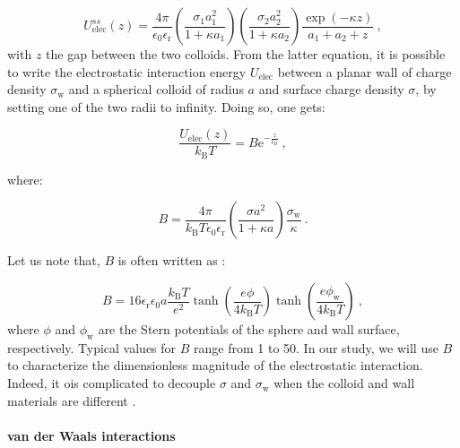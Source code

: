 \begin{equation}
	U_\textrm{elec} ^{ss}(z) = \frac{4\pi}{\epsilon_0 \epsilon_\mathrm{r}} 
	\left(
	\frac{\sigma_1 a_1 ^2}{1 + \kappa a_1}
	\right)
	\left(
	\frac{\sigma_2 a_2 ^2}{1 + \kappa a_2}
	\right)
	\frac{\exp(-\kappa z)}{a_1 + a_2 + z} ~,
\end{equation} 
with $z$ the gap between the two colloids.
From the latter equation, it is possible to write the electrostatic interaction energy $U_\textrm{elec}$ between a planar wall of charge density $\sigma_\textrm{w}$ and a spherical colloid of radius $a$ and surface charge density $\sigma$, by setting one of the two radii to infinity. Doing so, one gets:

\begin{equation}
	\frac{U_\textrm{elec}(z)}{k_\mathrm{B}T}  = B \mathrm{e}^{-\frac{z}{\ell_\mathrm{D}}}~,
	\label{Eq:Uelec}
\end{equation}

where:

\begin{equation}
	B = \frac{4 \pi}{ k_\mathrm{B}T\epsilon_0 \epsilon_\mathrm{r}} \left( \frac{\sigma a^2 }{1 + \kappa a}  \right) \frac{\sigma_\mathrm{w}}{\kappa} ~.
\end{equation}

Let us note that, $B$ is often written as \cite{behrens_charge_2001}:

\begin{equation}
	B = 16 \epsilon_\mathrm{r} \epsilon_0 a \frac{ k_\mathrm{B}T }{e^2} \tanh \left(\frac{e\phi}{4k_\mathrm{B}T}\right) \tanh \left(\frac{e\phi_\mathrm{w}}{4k_\mathrm{B}T}\right) ~,
\end{equation}
where $\phi$ and $\phi_\mathrm{w}$ are the Stern potentials of the sphere and wall surface, respectively. Typical values for $B$ range from 1 to 50. In our study, we will use $B$  to characterize the dimensionless magnitude of the electrostatic interaction. Indeed, it ois complicated to decouple $\sigma$ and $\sigma_\mathrm{w}$ when the colloid and wall materials are different \cite{behrens_charge_2001}.

\paragraph{van der Waals interactions}\mbox{}\\
\vspace{0.10cm}

